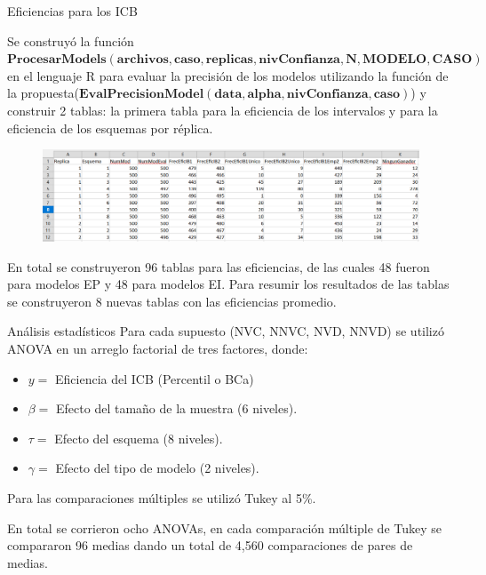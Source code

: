 \documentclass[serif, aspectratio=169]{beamer}
\begin{document}
\begin{frame}{Eficiencias para los ICB }

Se construyó la función $\mathbf{ProcesarModels(archivos, caso, replicas, nivConfianza, N, MODELO, CASO)}$ en el lenguaje R para evaluar la precisión de los modelos  utilizando la función de la propuesta($\mathbf{EvalPrecisionModel(data, alpha, nivConfianza, caso)}$) y construir 2 tablas: la primera tabla para la eficiencia de los intervalos y para la eficiencia de los esquemas por réplica.
	
	\begin{figure}[ht!]
		\centering 
		\includegraphics[width=0.73\linewidth]{recurso/tabla_eficiencia_intervalo.png} 
		\label{fig:tablaEficInt}
	\end{figure}
	
	
En total se construyeron 96 tablas para las eficiencias, de las cuales 48 fueron para modelos EP y 48 para modelos EI. Para resumir los resultados de las tablas se construyeron 8 nuevas tablas con las eficiencias promedio.
\end{frame}






\begin{frame}{Análisis estadísticos}
	Para cada supuesto (NVC, NNVC, NVD, NNVD) se utilizó ANOVA en un arreglo factorial de tres factores, donde: \\
	
	\begin{itemize}
		\item 	$y = $ Eficiencia del ICB (Percentil o BCa)
	
		\item 	$ \beta=$  Efecto del tamaño de la muestra (6 niveles).
	
		\item 	$ \tau=$ Efecto del esquema (8 niveles).
	
		\item 	$ \gamma=$ Efecto del tipo de modelo (2 niveles).
	\end{itemize}
	
	Para las comparaciones múltiples se utilizó Tukey al 5\%.
	\vspace{.3cm}
	
	
	En total se corrieron ocho ANOVAs, en cada comparación múltiple de Tukey se compararon 96 medias dando un total de 4,560 comparaciones de pares de medias.
\end{frame}
\end{document}

